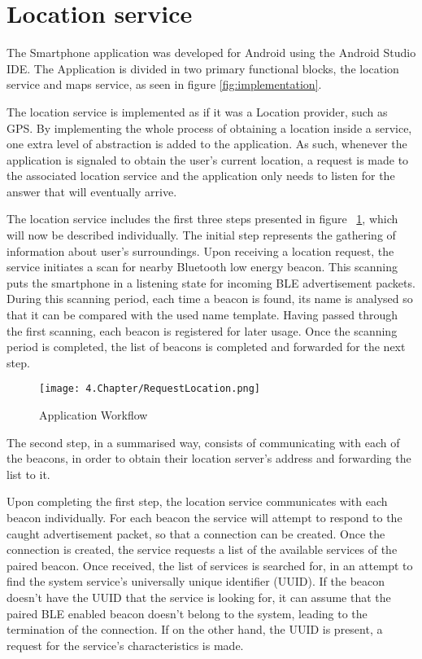 \section{Location service} 
\label{sec:LocService} 
 
 
The Smartphone application was developed for Android using the Android Studio IDE. The Application is divided in two primary functional blocks, the location service and maps service, as seen in figure \ref{fig:implementation}. 
 
 
The location service is implemented as if it was a Location provider, such as GPS. By implementing the whole process of obtaining a location inside a service, one extra level of abstraction is added to the application. As such, whenever the application is signaled to obtain the user's current location, a request is made to the associated location service and the application only needs to listen for the answer that will eventually arrive. 
 
 
 
 
 
 
The location service includes the first three steps presented in figure ~\ref{fig:MockProvider}, which will now be described individually. The initial step represents the gathering of information about user's surroundings. Upon receiving a location request, the service initiates a scan for nearby Bluetooth low energy beacon. This scanning puts the smartphone in a listening state for incoming \ac{BLE} advertisement packets. During this scanning period, each time a beacon is found, its name is analysed so that it can be compared with the used name template. Having passed through the first scanning, each beacon is registered for later usage. Once the scanning period is completed, the list of beacons is completed and forwarded for the next step. 
 
 
\begin{figure}[H] 
\centering 
\texttt{[image: 4.Chapter/RequestLocation.png]} 
\caption[Application Workflow]{Application Workflow} 
\label{fig:MockProvider} 
\end{figure} 
 
 
The second step, in a summarised way, consists of communicating with each of the beacons, in order to obtain their location server's address and forwarding the list to it.  
 
 
Upon completing the first step, the location service communicates with each beacon individually. For each beacon the service will attempt to respond to the caught advertisement packet, so that a connection can be created. Once the connection is created, the service requests a list of the available services of the paired beacon. 
Once received, the list of services is searched for, in an attempt to find the system service's universally unique identifier (UUID). If the beacon doesn't have the UUID that the service is looking for, it can assume that the paired \ac{BLE} enabled beacon doesn't belong to the system, leading to the termination of the connection. If on the other hand, the UUID is present, a request for the service's characteristics is made.  
 
